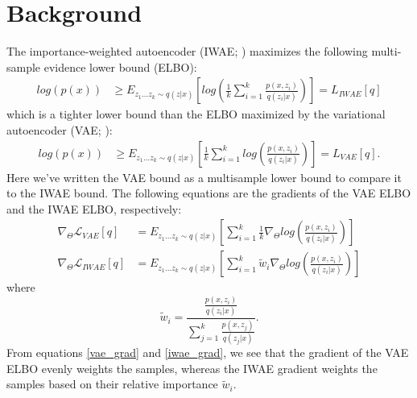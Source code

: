 \documentclass{article} %
\newcommand{\eqname}[1]{\tag*{#1}}
\begin{document}
\section{Background}
The importance-weighted autoencoder (IWAE; \cite{burda2015importance}) maximizes the following multi-sample evidence lower bound (ELBO): 
\begin{align} 
    log(p(x)) &
    \geq E_{z_{1}...z_{k} \sim q(z|x)} \left[log\left(  \frac{1}{k}  \sum_{i=1}^k \frac{p(x,z_i)}{q(z_i|x)}  \right)  \right] = L_{IWAE}[q] \label{iwae_elbo}  \eqname{(IWAE ELBO)}
\end{align}
which is a tighter lower bound than the ELBO maximized by the variational autoencoder (VAE; \cite{vae}):
\begin{align}
    log(p(x)) & \geq E_{z_{1}...z_{k} \sim q(z|x)} \left[  \frac{1}{k}\sum_{i=1}^k log\left(\frac{p(x,z_i)}{q(z_i|x)}  \right)  \right] = L_{VAE}[q]. \label{vae_elbo} \eqname{(VAE ELBO)}
\end{align}
Here we've written the VAE bound as a multisample lower bound to compare it to the IWAE bound. The following equations are the gradients of the VAE ELBO and the IWAE ELBO, respectively:
\begin{align} 
    \nabla_{\Theta} \mathcal{L}_{VAE}[q] &= E_{z_{1}...z_{k} \sim q(z|x)} \left[   \sum_{i=1}^k \frac{1}{k} \nabla_{\Theta} log\left(\frac{p(x,z_i)}{q(z_i|x)}  \right)  \right] \label{vae_grad} \\
    \nabla_{\Theta} \mathcal{L}_{IWAE}[q] &= E_{z_{1}...z_{k} \sim q(z|x)} \left[  \sum_{i=1}^k \tilde{w}_i \nabla_{\Theta} log\left(\frac{p(x,z_i)}{q(z_i|x)}  \right)  \right] \label{iwae_grad}
\end{align}
where $$\tilde{w}_i = \frac{\frac{p(x,z_i)}{q(z_i|x)}}{\sum_{j=1}^k \frac{p(x,z_j)}{q(z_j|x)}}.$$
From equations \eqref{vae_grad} and \eqref{iwae_grad}, we see that the gradient of the VAE ELBO evenly weights the samples, whereas the IWAE gradient weights the samples based on their relative importance $\tilde{w}_i$.




\end{document}
